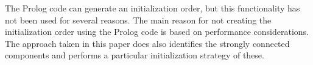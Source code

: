 The Prolog code can generate an initialization order, but this functionality has not been used for several reasons. The main reason for not creating the initialization order using the Prolog code is based on performance considerations. The approach taken in this paper does also identifies the strongly connected components and performs a particular initialization strategy of these.